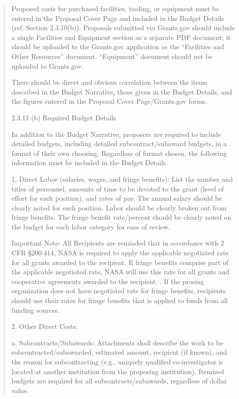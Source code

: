 \documentclass[12pt]{article}
\begin{document}
\begin{quote}
Proposed costs for purchased facilities, tooling, or equipment must be
entered in the Proposal Cover Page and included in the Budget Details
(ref. Section 2.3.10(b)). Proposals submitted via Grants.gov should
include a single Facilities and Equipment section as a separate PDF
document; it should be uploaded to the Grants.gov application as the
``Facilities and Other Resources'' document. ``Equipment'' document should
not be uploaded to Grants.gov.

There should be direct and obvious correlation between the items
described in the Budget Narrative, those given in the Budget Details,
and the figures entered in the Proposal Cover Page/Grants.gov forms.

2.3.11 (b) Required Budget Details

In addition to the Budget Narrative, proposers are required to include
detailed budgets, including detailed subcontract/subaward budgets, in
a format of their own choosing. Regardless of format chosen, the
following information must be included in the Budget Details.

1. Direct Labor (salaries, wages, and fringe benefits): List the
   number and titles of personnel, amounts of time to be devoted to
   the grant (level of effort for each position), and rates of
   pay. The annual salary should be clearly noted for each
   position. Labor should be clearly broken out from fringe
   benefits. The fringe benefit rate/percent should be clearly noted
   on the budget for each labor category for ease of review.

Important Note: All Recipients are reminded that in accordance with 2
CFR \S 200.414, NASA is required to apply the applicable negotiated
rate for all grants awarded to the recipient. If fringe benefits
comprise part of the applicable negotiated rate, NASA will use this
rate for all grants and cooperative agreements awarded to the
recipient. . If the prosing organization does not have negotiated rate
for fringe benefits, recipients should use their rates for fringe
benefits that is applied to funds from all funding sources.



2. Other
Direct Costs:

a. Subcontracts/Subawards: Attachments shall describe the work to be
subcontracted/subawarded, estimated amount, recipient (if known), and
the reason for subcontracting (e.g., uniquely qualified
co-investigator is located at another institution from the proposing
institution). Itemized budgets are required for all
subcontracts/subawards, regardless of dollar value.


\end{quote}
\end{document}
